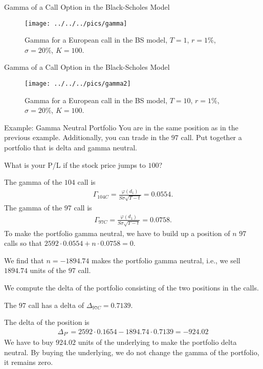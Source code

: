 Gamma of a Call Option in the Black-Scholes Model
	\begin{figure}[htp]
	\begin{center}
		\texttt{[image: ../../../pics/gamma]}
		\caption{Gamma for a European call in the BS model, $T=1$, $r=1\%$,
		$\sigma=20\%$, $K=100$.}
		\label{fig:gammaBS}
	\end{center}
	\end{figure}


Gamma of a Call Option in the Black-Scholes Model
	\begin{figure}[htp]
	\begin{center}
		\texttt{[image: ../../../pics/gamma2]}
		\caption{Gamma for a European call in the BS model, $T=10$, $r=1\%$,
		$\sigma=20\%$, $K=100$.}
		\label{fig:gamma2BS}
	\end{center}
	\end{figure}


Example: Gamma Neutral Portfolio
	You are in the same position as in the previous example. Additionally, you can
	trade in the $97$ call.
		Put together a portfolio that is delta and gamma neutral.
		
		What is your P/L if the stock price jumps to $100$?

		The gamma of the $104$ call is
			\begin{align*}
			\Gamma_{104C} = \frac{\varphi(d_1)}{S\sigma \sqrt{T-t}} = 0.0554.
			\end{align*}
		The gamma of the $97$ call is
			\begin{align*}
			\Gamma_{97C} = \frac{\varphi(d_1)}{S\sigma \sqrt{T-t}} = 0.0758.
			\end{align*}
		To make the portfolio gamma neutral, we have to build up a position of
		$n$ $97$ calls so that $2592\cdot 0.0554 +n\cdot 0.0758 = 0$.
		
		We find that $n=-1894.74$ makes the portfolio gamma neutral, i.e., we
		sell $1894.74$ units of the $97$ call.

		We compute the delta of the portfolio consisting of the two positions in
		the calls.
   
		The $97$ call has a delta of $\Delta_{97C}=0.7139$.
		
		The delta of the position is
			\begin{align*}
				\Delta_{P'} = 2592 \cdot 0.1654 - 1894.74 \cdot 0.7139 = -924.02
			\end{align*}
		We have to buy $924.02$ units of the underlying to make the portfolio
		delta neutral. By buying the underlying, we do not change the gamma of the
		portfolio, it remains zero.

